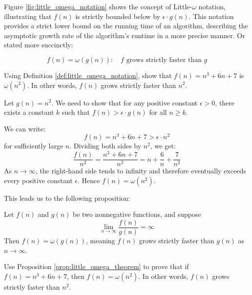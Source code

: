 Figure \ref{fig:little_omega_notation} shows the concept of Little-$\omega$ notation, illustrating that $f(n)$ is strictly bounded below by $\epsilon \cdot g(n)$. This notation provides a strict lower bound on the running time of an algorithm, describing the asymptotic growth rate of the algorithm's runtime in a more precise manner. Or stated more succinctly:

\[
f(n)=\omega(g(n)): \quad f \text{ grows strictly faster than } g
\]

\begin{example}
    Using Definition \ref{def:little_omega_notation}, show that $f(n)=n^3 + 6n + 7$ is $\omega(n^2)$. In other words, $f(n)$ grows strictly faster than $n^2$.
\end{example}

\begin{solution}
    Let $g(n) = n^2$. We need to show that for any positive constant $\epsilon > 0$, there exists a constant $k$ such that $f(n) > \epsilon \cdot g(n)$ for all $n \geq k$.

    We can write:
    \[
    f(n) = n^3 + 6n + 7 > \epsilon \cdot n^2
    \]
    for sufficiently large $n$. Dividing both sides by $n^2$, we get:
    \[
    \frac{f(n)}{n^2} = \frac{n^3 + 6n + 7}{n^2} = n + \frac{6}{n} + \frac{7}{n^2}
    \]
    As $n \to \infty$, the right-hand side tends to infinity and therefore eventually exceeds every positive constant $\epsilon$. Hence $f(n) = \omega(n^2)$.
\end{solution}

This leads us to the following proposition:

\begin{proposition} \label{prop:little_omega_theorem}
    Let \( f(n) \) and \( g(n) \) be two nonnegative functions, and suppose
    \medskip
    \[
    \lim_{n \rightarrow \infty} \frac{f(n)}{g(n)} = \infty
    \]
    \medskip
    Then \( f(n) = \omega(g(n)) \), meaning \( f(n) \) grows strictly faster than \( g(n) \) as \( n \to \infty \).
\end{proposition}

\begin{example}
    Use Proposition \ref{prop:little_omega_theorem} to prove that if \( f(n) = n^3 + 6n + 7 \), then \( f(n) = \omega(n^2) \). In other words, \( f(n) \) grows strictly faster than \( n^2 \).
\end{example}

